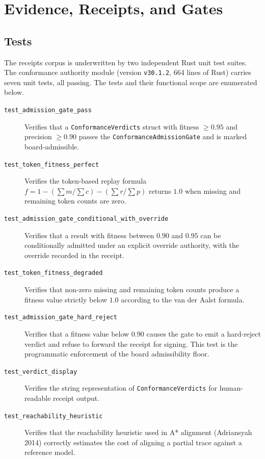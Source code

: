 \section{Evidence, Receipts, and Gates}
\label{sec:receipts-evidence}

\subsection{Tests}
\label{sec:receipts-evidence-tests}

The receipts corpus is underwritten by two independent Rust unit test suites. The
conformance authority module (version \texttt{v30.1.2}, 664 lines of Rust) carries
seven unit tests, all passing. The tests and their functional scope are enumerated
below.

\begin{description}
  \item[\texttt{test\_admission\_gate\_pass}] Verifies that a \texttt{ConformanceVerdicts}
    struct with fitness $\geq 0.95$ and precision $\geq 0.90$ passes the
    \texttt{ConformanceAdmissionGate} and is marked board-admissible.
  \item[\texttt{test\_token\_fitness\_perfect}] Verifies the token-based replay formula
    $f = 1 - (\sum m / \sum c) - (\sum r / \sum p)$ returns $1.0$ when missing and
    remaining token counts are zero.
  \item[\texttt{test\_admission\_gate\_conditional\_with\_override}] Verifies that a result
    with fitness between $0.90$ and $0.95$ can be conditionally admitted under an explicit
    override authority, with the override recorded in the receipt.
  \item[\texttt{test\_token\_fitness\_degraded}] Verifies that non-zero missing and remaining
    token counts produce a fitness value strictly below $1.0$ according to the van der Aalst
    formula.
  \item[\texttt{test\_admission\_gate\_hard\_reject}] Verifies that a fitness value below
    $0.90$ causes the gate to emit a hard-reject verdict and refuse to forward the receipt
    for signing. This test is the programmatic enforcement of the board admissibility floor.
  \item[\texttt{test\_verdict\_display}] Verifies the string representation of
    \texttt{ConformanceVerdicts} for human-readable receipt output.
  \item[\texttt{test\_reachability\_heuristic}] Verifies that the reachability heuristic
    used in A* alignment (Adriansyah 2014) correctly estimates the cost of aligning a
    partial trace against a reference model.
\end{description}

